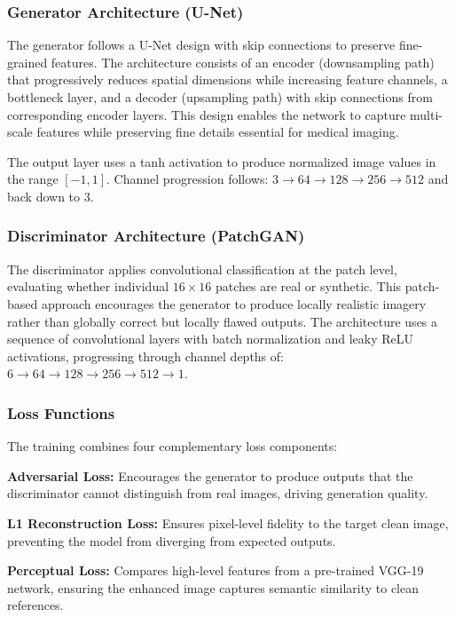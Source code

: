 \documentclass[10pt,conference,letterpaper]{IEEEtran}
\begin{document}
\subsubsection{Generator Architecture (U-Net)}

The generator follows a U-Net design with skip connections to preserve fine-grained features. The architecture consists of an encoder (downsampling path) that progressively reduces spatial dimensions while increasing feature channels, a bottleneck layer, and a decoder (upsampling path) with skip connections from corresponding encoder layers. This design enables the network to capture multi-scale features while preserving fine details essential for medical imaging.

The output layer uses a tanh activation to produce normalized image values in the range $[-1, 1]$. Channel progression follows: $3 \rightarrow 64 \rightarrow 128 \rightarrow 256 \rightarrow 512$ and back down to $3$.

\subsubsection{Discriminator Architecture (PatchGAN)}

The discriminator applies convolutional classification at the patch level, evaluating whether individual $16 \times 16$ patches are real or synthetic. This patch-based approach encourages the generator to produce locally realistic imagery rather than globally correct but locally flawed outputs. The architecture uses a sequence of convolutional layers with batch normalization and leaky ReLU activations, progressing through channel depths of: $6 \rightarrow 64 \rightarrow 128 \rightarrow 256 \rightarrow 512 \rightarrow 1$.

\subsubsection{Loss Functions}

The training combines four complementary loss components:

\textbf{Adversarial Loss:} Encourages the generator to produce outputs that the discriminator cannot distinguish from real images, driving generation quality.

\textbf{L1 Reconstruction Loss:} Ensures pixel-level fidelity to the target clean image, preventing the model from diverging from expected outputs.

\textbf{Perceptual Loss:} Compares high-level features from a pre-trained VGG-19 network, ensuring the enhanced image captures semantic similarity to clean references.
\end{document}
